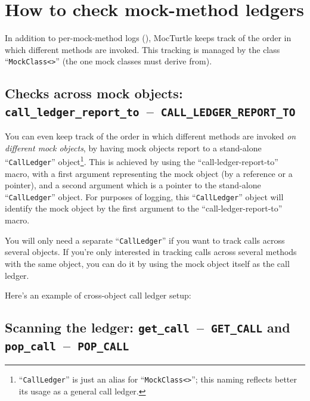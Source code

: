 \documentclass[twoside, a4paper, article]{memoir}
\newcommand*\testudocolor{\color{red!80!blue}}
\newcommand*\testudo[1]{\texttt{\testudocolor{}#1}}
\newcommand*\testudopair[2]{\testudo{#1}~--~\testudo{#2}}
\newcommand\subsectiontestudopair[3]{%
  \subsection[#1]{#1: \testudopair{#2}{#3}}}
\newcommand\typesetexample[1]{%
  \typesetexamplesource{#1}
}
\providecommand\typesetexamplesource[1]{%
}
\begin{document}
\section{How to check mock-method ledgers}
\label{sec:check-mock-method-ledgers}

In addition to per-mock-method logs (),
MocTurtle keeps track of the order in which different methods are invoked.
This tracking is managed by the class ``\texttt{MockClass<>}'' (the one mock
classes must derive from).

\subsectiontestudopair{Checks across mock objects}%
  {call\_ledger\_report\_to}{CALL\_LEDGER\_REPORT\_TO}
\label{sec:check-mock-method-ledgers-across-mock-objects}

You can even keep track of the order in which different methods are invoked
\emph{on different mock objects}, by having mock objects report to a
stand-alone ``\texttt{CallLedger}''
object\footnote{``\texttt{CallLedger}'' is just an alias for
  ``\texttt{MockClass<>}''; this naming reflects better its usage as a
  general call ledger.}.
This is achieved by using the ``call-ledger-report-to'' macro, with a first
argument representing the mock object (by a reference or a pointer), and a
second argument which is a pointer to the stand-alone ``\texttt{CallLedger}''
object.  For purposes of logging, this ``\texttt{CallLedger}'' object will
identify the mock object by the first argument to the ``call-ledger-report-to''
macro.

You will only need a separate ``\texttt{CallLedger}'' if you want to
track calls across several objects.  If you're only interested in tracking
calls across several methods with the same object, you can do it by using the
mock object itself as the call ledger.

Here's an example of cross-object call ledger setup:

\typesetexample{ledger-setup}

\subsection[Scanning the ledger]%
  {Scanning the ledger:
    \testudopair{get\_call}{GET\_CALL} and
    \testudopair{pop\_call}{POP\_CALL}}
\label{sec:scan-ledger}
\end{document}
